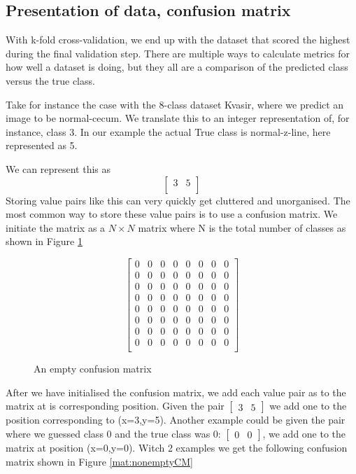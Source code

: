 \subsection{Presentation of data, confusion matrix}
With k-fold cross-validation, we end up with the dataset that scored the highest during the final validation step.  There are multiple ways to calculate metrics for how well a dataset is doing,  but they all are a comparison of the predicted class versus the true class.  

Take for instance the case with the 8-class dataset Kvasir, where we predict an image to be normal-cecum. We translate this to an integer representation of, for instance, class 3. In our example the actual True class is normal-z-line, here represented as 5. 

We can represent this as 
\[
\begin{bmatrix}
 3 & 5\\ 
\end{bmatrix}
\]
Storing value pairs like this can very quickly get cluttered and unorganised.
The most common way to store these value pairs is to use a confusion matrix.  We initiate the matrix as a \textit{$N \times N$} matrix where N is the total number of classes as shown in Figure \ref{mat:emptyCM}

\begin{figure}
	\myfontsize
    \centering
    \[
    \begin{bmatrix}
     0 & 0 &  0 &  0 &  0 &  0 &  0 &  0\\
     0 & 0 &  0 &  0 &  0 &  0 &  0 &  0\\
     0 & 0 &  0 &  0 &  0 &  0 &  0 &  0\\
     0 & 0 &  0 &  0 &  0 &  0 &  0 &  0\\
     0 & 0 &  0 &  0 &  0 &  0 &  0 &  0\\
     0 & 0 &  0 &  0 &  0 &  0 &  0 &  0\\
     0 & 0 &  0 &  0 &  0 &  0 &  0 &  0\\
     0 & 0 &  0 &  0 &  0 &  0 &  0 &  0\\
    \end{bmatrix}
    \]
    \caption{An empty confusion matrix}
    \label{mat:emptyCM}
\end{figure}



After we have initialised the confusion matrix, we add each value pair as to the matrix at is corresponding position.  
Given the pair $\begin{bmatrix} 3 & 5 \end{bmatrix}$ we add one to the position corresponding to (x=3,y=5). 
 Another example could be given the pair where we guessed class 0 and the true class was 0:  $\begin{bmatrix}  0 & 0 \end{bmatrix}$, we add one to the matrix at position (x=0,y=0). Witch 2 examples we get the following confusion matrix shown in Figure \ref{mat:nonemptyCM}

